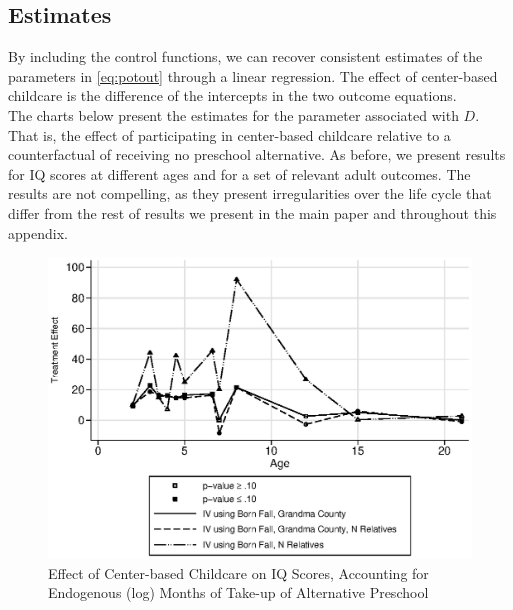 \subsection{Estimates}

\noindent By including the control functions, we can recover consistent estimates of the parameters in \eqref{eq:potout} through a linear regression. The effect of center-based childcare is the difference of the intercepts in the two outcome equations.\\

\noindent The charts below present the estimates for the parameter associated with $D$. That is, the effect of participating in center-based childcare relative to a counterfactual of receiving no preschool alternative. As before, we present results for IQ scores at different ages and for a set of relevant adult outcomes. The results are not compelling, as they present irregularities over the life cycle that differ from the rest of results we present in the main paper and throughout this appendix.

\begin{figure}[H]
		\caption{Effect of Center-based Childcare on IQ Scores, Accounting for Endogenous (log) Months of Take-up of Alternative Preschool} \label{output/appendixplots/Q_cf_te.eps}
		\includegraphics[width=.7\columnwidth]{output/appendixplots/ins_inter_logQ_iv_te.eps}
\end{figure}

